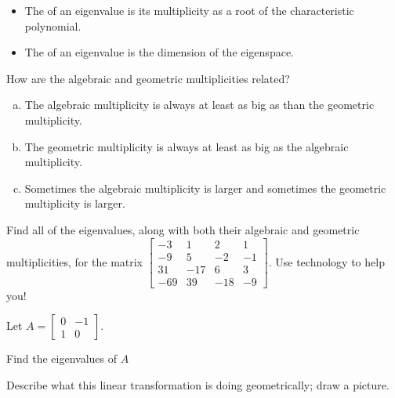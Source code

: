 \begin{applicationActivities}{4}{28}
\begin{definition}

\begin{itemize}
\item The  of an eigenvalue is its multiplicity as a root of the characteristic polynomial.
\item The  of an eigenvalue is the dimension of the eigenspace.
\end{itemize}

\end{definition}

\begin{activity}{5} How are the algebraic and geometric multiplicities related?
\begin{enumerate}[(a)]
\item The algebraic multiplicity is always at least as big as than the geometric multiplicity.
\item The geometric multiplicity is always at least as big as the algebraic multiplicity.
\item Sometimes the algebraic multiplicity is larger and sometimes the geometric multiplicity is larger.
\end{enumerate}
\end{activity}

\begin{activity}{20}
   Find all of the eigenvalues, along with both their algebraic and geometric multiplicities, for the matrix $\begin{bmatrix} -3 & 1 & 2 & 1 \\ -9 & 5 & -2 & -1 \\ 31 & -17 & 6 & 3 \\ -69 & 39 & -18 & -9 \end{bmatrix}$.  Use technology to help you!
\end{activity}



\begin{activity}{10}
Let  $A=\begin{bmatrix}0 & -1 \\ 1 & 0 \end{bmatrix}$.
\begin{subactivity}
  Find the eigenvalues of $A$
  \end{subactivity}
  \begin{subactivity}
   Describe what this linear transformation is doing geometrically; draw a picture.
   \end{subactivity}
\end{activity}



\end{applicationActivities}
